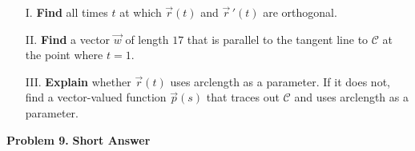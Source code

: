 \documentclass{ximera}
\begin{document}
\begin{enumerate}
\item[I.] \textbf{Find} all times $t$ at which $\vec{r}(t)$ and $\vec{r} \, ' (t)$ are orthogonal. 

\vspace{35mm}

\item[II.]  \textbf{Find} a vector $\vec{w}$ of length $17$ that is parallel to the tangent line to $\mathcal{C}$ at the point where $t=1$.  

\vspace{35mm}


\item[III.] \textbf{Explain} whether $\vec{r} (t)$ uses arclength as a parameter.  If it does not, find a vector-valued function $\vec{p}(s)$ that traces out $\mathcal{C}$ and uses arclength as a parameter.
\end{enumerate}


\textbf{Problem 9.} \textbf{Short Answer}
\end{document}
